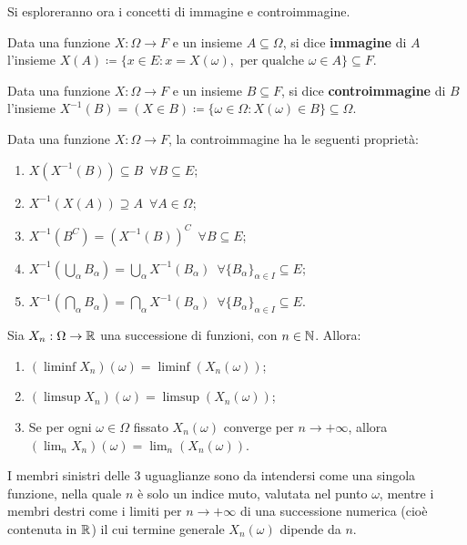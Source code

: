 Si esploreranno ora i concetti di immagine e controimmagine.
\begin{defn}
	Data una funzione $X: \Omega \to F$ e un insieme $A \subseteq \Omega$, si dice \textbf{immagine} di $A$ l'insieme
	$X(A) \coloneqq \{x \in E : x = X(\omega), \text{ per qualche }\omega \in A \} \subseteq F$.
\end{defn}

\begin{defn}
	Data una funzione $X: \Omega \to F$ e un insieme $B \subseteq F$, si dice \textbf{controimmagine} di $B$ l'insieme
	$X^{-1}(B) = (X \in B) \coloneqq \{ \omega \in \Omega : X(\omega) \in B\} \subseteq \Omega$.
\end{defn}

\begin{teo}
	Data una funzione $X: \Omega \to F$, la controimmagine ha le seguenti proprietà:
	\begin{enumerate}
		\item $X(X^{-1}(B)) \subseteq B \enspace \forall B \subseteq E$;
		\item $X^{-1}(X(A))\supseteq A \enspace \forall A \in \Omega$;
		\item $X^{-1}(B^C)=(X^{-1}(B))^C \enspace \forall B \subseteq E$;
		\item $X^{-1}\left(\bigcup_{\alpha}B_\alpha \right) = \bigcup_{\alpha}X^{-1}(B_\alpha) \enspace
		\forall \{B_\alpha\}_{\alpha \in I} \subseteq E$;
		\item $X^{-1}\left(\bigcap_{\alpha}B_\alpha \right) = \bigcap_{\alpha}X^{-1}(B_\alpha) \enspace
		\forall \{B_\alpha\}_{\alpha \in I} \subseteq E$.
	\end{enumerate}
\end{teo}

\begin{teo}
	Sia $X_n : \Omega \to \mathbb R$ una successione di funzioni, con $n \in \mathbb N$. Allora:
	\begin{enumerate}
		\item $(\liminf X_n)(\omega) = \liminf \left( X_n(\omega) \right)$;
		\item $(\limsup X_n)(\omega) = \limsup \left( X_n(\omega) \right)$;
		\item Se per ogni $\omega \in \Omega$ fissato $X_n(\omega)$ converge per $n \to +\infty$, allora $(\lim_n X_n)(\omega) = \lim_n \left( X_n(\omega) \right)$.
	\end{enumerate}
\end{teo}
I membri sinistri delle 3 uguaglianze sono da intendersi come una singola funzione, nella quale $n$ è solo un indice muto, valutata nel punto $\omega$,
mentre i membri destri come i limiti per $n \to +\infty$ di una successione numerica (cioè contenuta in $\mathbb R$) il cui termine generale $X_n(\omega)$ dipende da $n$.


